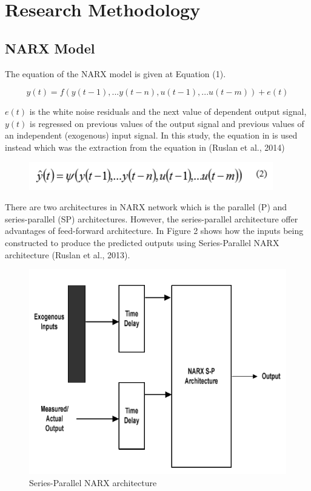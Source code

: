 \documentclass[12pt,a4paper,openany]{report}
\begin{document}
\section{Research Methodology}
\subsection{NARX Model}
The equation of the NARX model is given at Equation (1).

\begin{equation}
y(t) = f(y(t-1),...y(t-n),u(t-1),...u(t-m)) + e(t)
\end{equation}

$e(t)$ is the white noise residuals and the next value of dependent output signal, $y(t)$ is regressed on previous values of the output signal and previous values of an independent (exogenous) input signal.  
In this study, the equation in is used instead which was the extraction from the equation in (Ruslan et al., 2014)
\begin{figure}[H]
\centering
\includegraphics[scale=0.8]{./images/eq}
\end{figure}

There are two architectures in NARX network which is the parallel (P) and series-parallel (SP) architectures. However, the series-parallel architecture offer advantages of feed-forward architecture. In Figure 2 shows how the inputs being constructed to produce the predicted outputs using Series-Parallel NARX architecture (Ruslan et al., 2013).
\begin{figure}[H]
\centering
\includegraphics[scale=0.6]{./images/SPNARX}
\caption {Series-Parallel NARX architecture}
\end{figure}
\end{document}
